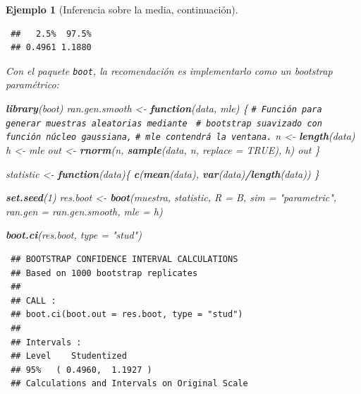\documentclass[
  spanish,
  10pt,
]{book}
\newenvironment{Shaded}{\begin{snugshade}}{\end{snugshade}}
\newcommand{\AttributeTok}[1]{\textcolor[rgb]{0.13,0.29,0.53}{#1}}
\newcommand{\CommentTok}[1]{\textcolor[rgb]{0.56,0.35,0.01}{\textit{#1}}}
\newcommand{\ConstantTok}[1]{\textcolor[rgb]{0.56,0.35,0.01}{#1}}
\newcommand{\ControlFlowTok}[1]{\textcolor[rgb]{0.13,0.29,0.53}{\textbf{#1}}}
\newcommand{\DecValTok}[1]{\textcolor[rgb]{0.00,0.00,0.81}{#1}}
\newcommand{\FunctionTok}[1]{\textcolor[rgb]{0.13,0.29,0.53}{\textbf{#1}}}
\newcommand{\NormalTok}[1]{#1}
\newcommand{\OtherTok}[1]{\textcolor[rgb]{0.56,0.35,0.01}{#1}}
\newcommand{\SpecialCharTok}[1]{\textcolor[rgb]{0.81,0.36,0.00}{\textbf{#1}}}
\newcommand{\StringTok}[1]{\textcolor[rgb]{0.31,0.60,0.02}{#1}}
\theoremstyle{break}
\newtheorem{example}{Ejemplo}[chapter]
\theoremstyle{nonumberplain}
\renewcommand{\CommentTok}[1]{\textcolor[rgb]{0.41,0.41,0.41}{\texttt{#1}}}
\begin{document}
\begin{example}[Inferencia sobre la media, continuación]
\begin{verbatim}
 ##   2.5%  97.5% 
 ## 0.4961 1.1880
\end{verbatim}

Con el paquete \texttt{boot}, la recomendación es implementarlo como
un bootstrap paramétrico:

\begin{Shaded}
\begin{Highlighting}[]
\FunctionTok{library}\NormalTok{(boot)}
\NormalTok{ran.gen.smooth }\OtherTok{\textless{}{-}} \ControlFlowTok{function}\NormalTok{(data, mle) \{}
    \CommentTok{\# Función para generar muestras aleatorias mediante }
    \CommentTok{\# bootstrap suavizado con función núcleo gaussiana,}
    \CommentTok{\# mle contendrá la ventana.}
\NormalTok{    n }\OtherTok{\textless{}{-}} \FunctionTok{length}\NormalTok{(data)}
\NormalTok{    h }\OtherTok{\textless{}{-}}\NormalTok{ mle}
\NormalTok{    out }\OtherTok{\textless{}{-}} \FunctionTok{rnorm}\NormalTok{(n, }\FunctionTok{sample}\NormalTok{(data, n, }\AttributeTok{replace =} \ConstantTok{TRUE}\NormalTok{), h)}
\NormalTok{    out}
\NormalTok{\}}

\NormalTok{statistic }\OtherTok{\textless{}{-}} \ControlFlowTok{function}\NormalTok{(data)\{}
    \FunctionTok{c}\NormalTok{(}\FunctionTok{mean}\NormalTok{(data), }\FunctionTok{var}\NormalTok{(data)}\SpecialCharTok{/}\FunctionTok{length}\NormalTok{(data))}
\NormalTok{\}}

\FunctionTok{set.seed}\NormalTok{(}\DecValTok{1}\NormalTok{)}
\NormalTok{res.boot }\OtherTok{\textless{}{-}} \FunctionTok{boot}\NormalTok{(muestra, statistic, }\AttributeTok{R =}\NormalTok{ B, }\AttributeTok{sim =} \StringTok{"parametric"}\NormalTok{,}
                 \AttributeTok{ran.gen =}\NormalTok{ ran.gen.smooth, }\AttributeTok{mle =}\NormalTok{ h)}

\FunctionTok{boot.ci}\NormalTok{(res.boot, }\AttributeTok{type =} \StringTok{"stud"}\NormalTok{)}
\end{Highlighting}
\end{Shaded}

\begin{verbatim}
 ## BOOTSTRAP CONFIDENCE INTERVAL CALCULATIONS
 ## Based on 1000 bootstrap replicates
 ## 
 ## CALL : 
 ## boot.ci(boot.out = res.boot, type = "stud")
 ## 
 ## Intervals : 
 ## Level    Studentized     
 ## 95%   ( 0.4960,  1.1927 )  
 ## Calculations and Intervals on Original Scale
\end{verbatim}

\end{example}
\end{document}
